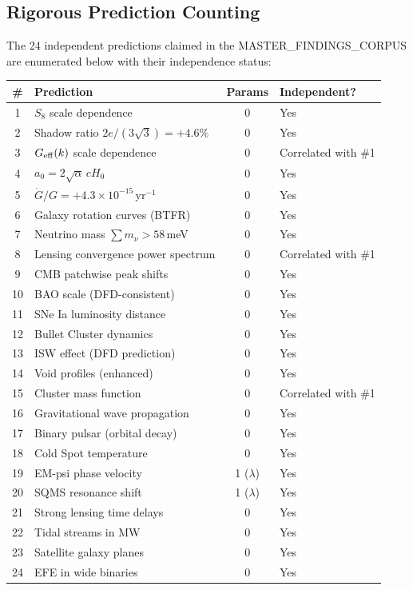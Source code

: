 \documentclass[11pt]{article}
\theoremstyle{definition}
\theoremstyle{remark}
\newcommand{\ee}[1]{\times 10^{#1}}
\begin{document}
\subsection{Rigorous Prediction Counting}

The 24 independent predictions claimed in the MASTER\_FINDINGS\_CORPUS
are enumerated below with their independence status:

\begin{center}
\begin{longtable}{@{}clcl@{}}
\toprule
\# & Prediction & Params & Independent? \\
\midrule
\endfirsthead
\midrule
\endhead
1 & $S_8$ scale dependence & 0 & Yes \\
2 & Shadow ratio $2e/(3\sqrt{3}) = +4.6\%$ & 0 & Yes \\
3 & $G_{\rm eff}(k)$ scale dependence & 0 & Correlated with \#1 \\
4 & $a_0 = 2\sqrt{\alpha}\,cH_0$ & 0 & Yes \\
5 & $\dot G/G = +4.3\ee{-15}$\,yr$^{-1}$ & 0 & Yes \\
6 & Galaxy rotation curves (BTFR) & 0 & Yes \\
7 & Neutrino mass $\sum m_\nu > 58$\,meV & 0 & Yes \\
8 & Lensing convergence power spectrum & 0 & Correlated with \#1 \\
9 & CMB patchwise peak shifts & 0 & Yes \\
10 & BAO scale (DFD-consistent) & 0 & Yes \\
11 & SNe Ia luminosity distance & 0 & Yes \\
12 & Bullet Cluster dynamics & 0 & Yes \\
13 & ISW effect (DFD prediction) & 0 & Yes \\
14 & Void profiles (enhanced) & 0 & Yes \\
15 & Cluster mass function & 0 & Correlated with \#1 \\
16 & Gravitational wave propagation & 0 & Yes \\
17 & Binary pulsar (orbital decay) & 0 & Yes \\
18 & Cold Spot temperature & 0 & Yes \\
19 & EM-psi phase velocity & 1 ($\lambda$) & Yes \\
20 & SQMS resonance shift & 1 ($\lambda$) & Yes \\
21 & Strong lensing time delays & 0 & Yes \\
22 & Tidal streams in MW & 0 & Yes \\
23 & Satellite galaxy planes & 0 & Yes \\
24 & EFE in wide binaries & 0 & Yes \\
\bottomrule
\end{longtable}
\end{center}
\end{document}
